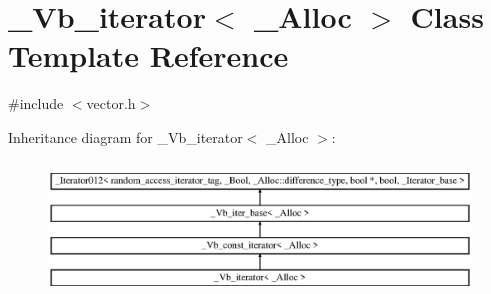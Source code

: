 \hypertarget{class___vb__iterator}{\section{\+\_\+\+Vb\+\_\+iterator$<$ \+\_\+\+Alloc $>$ Class Template Reference}
\label{class___vb__iterator}
}


{\ttfamily \#include $<$vector.\+h$>$}

Inheritance diagram for \+\_\+\+Vb\+\_\+iterator$<$ \+\_\+\+Alloc $>$\+:\begin{figure}[H]
\begin{center}
\leavevmode
\includegraphics[height=3.607085cm]{class___vb__iterator}
\end{center}
\end{figure}
